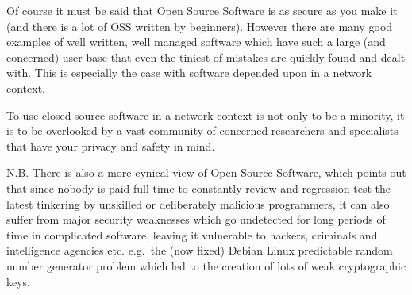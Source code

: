 Of course it must be said that Open Source Software is as secure as you
make it (and there is a lot of OSS written by beginners). However there
are many good examples of well written, well managed software which have
such a large (and concerned) user base that even the tiniest of mistakes
are quickly found and dealt with. This is especially the case with
software depended upon in a network context.

To use closed source software in a network context is not only to be a
minority, it is to be overlooked by a vast community of concerned
researchers and specialists that have your privacy and safety in mind.

N.B. There is also a more cynical view of Open Source Software, which
points out that since nobody is paid full time to constantly review and
regression test the latest tinkering by unskilled or deliberately
malicious programmers, it can also suffer from major security weaknesses
which go undetected for long periods of time in complicated software,
leaving it vulnerable to hackers, criminals and intelligence agencies
etc. e.g.~the (now fixed) Debian Linux predictable random number
generator problem which led to the creation of lots of weak
cryptographic keys.

